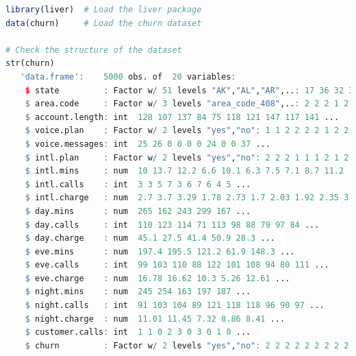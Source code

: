 \documentclass[
  11pt,
]{book}
\theoremstyle{definition}
\theoremstyle{definition}
\theoremstyle{definition}
\theoremstyle{definition}
\theoremstyle{remark}
\begin{document}
\begin{lstlisting}[language=R]
library(liver)  # Load the liver package
data(churn)     # Load the churn dataset

# Check the structure of the dataset
str(churn)
   'data.frame':    5000 obs. of  20 variables:
    $ state         : Factor w/ 51 levels "AK","AL","AR",..: 17 36 32 36 37 2 20 25 19 50 ...
    $ area.code     : Factor w/ 3 levels "area_code_408",..: 2 2 2 1 2 3 3 2 1 2 ...
    $ account.length: int  128 107 137 84 75 118 121 147 117 141 ...
    $ voice.plan    : Factor w/ 2 levels "yes","no": 1 1 2 2 2 2 1 2 2 1 ...
    $ voice.messages: int  25 26 0 0 0 0 24 0 0 37 ...
    $ intl.plan     : Factor w/ 2 levels "yes","no": 2 2 2 1 1 1 2 1 2 1 ...
    $ intl.mins     : num  10 13.7 12.2 6.6 10.1 6.3 7.5 7.1 8.7 11.2 ...
    $ intl.calls    : int  3 3 5 7 3 6 7 6 4 5 ...
    $ intl.charge   : num  2.7 3.7 3.29 1.78 2.73 1.7 2.03 1.92 2.35 3.02 ...
    $ day.mins      : num  265 162 243 299 167 ...
    $ day.calls     : int  110 123 114 71 113 98 88 79 97 84 ...
    $ day.charge    : num  45.1 27.5 41.4 50.9 28.3 ...
    $ eve.mins      : num  197.4 195.5 121.2 61.9 148.3 ...
    $ eve.calls     : int  99 103 110 88 122 101 108 94 80 111 ...
    $ eve.charge    : num  16.78 16.62 10.3 5.26 12.61 ...
    $ night.mins    : num  245 254 163 197 187 ...
    $ night.calls   : int  91 103 104 89 121 118 118 96 90 97 ...
    $ night.charge  : num  11.01 11.45 7.32 8.86 8.41 ...
    $ customer.calls: int  1 1 0 2 3 0 3 0 1 0 ...
    $ churn         : Factor w/ 2 levels "yes","no": 2 2 2 2 2 2 2 2 2 2 ...


\end{lstlisting}
\end{document}

